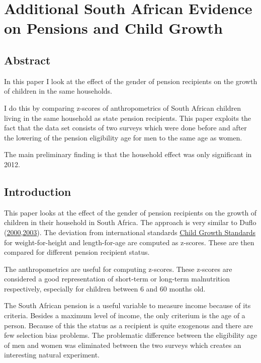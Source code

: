 \documentclass[draft.tex]{subfiles}
\begin{document}
\chapter{Additional South African Evidence on Pensions and Child Growth}

\section{Abstract}

In this paper I look at the effect of the gender of pension recipients
on the growth of children in the same households.

I do this by comparing z-scores of anthropometrics of South African
children living in the same household as state pension recipients. This
paper exploits the fact that the data set consists of two surveys which
were done before and after the lowering of the pension eligibility age
for men to the same age as women.

The main preliminary finding is that the household effect was only
significant in 2012.

\section{Introduction}

This paper looks at the effect of the gender of pension recipients on
the growth of children in their household in South Africa. The approach
is very similar to Duflo
(\href{http://www.jstor.org/discover/10.2307/117257}{2000},\href{http://wber.oxfordjournals.org/content/17/1/1}{2003}).
The deviation from international standards
\href{http://www.who.int/childgrowth/en/}{Child Growth Standards} for
weight-for-height and length-for-age are computed as z-scores. These are
then compared for different pension recipient status.

The anthropometrics are useful for computing z-scores. These z-scores
are considered a good representation of short-term or long-term
malnutrition respectively, especially for children between 6 and 60
months old.

The South African pension is a useful variable to measure income because
of its criteria. Besides a maximum level of income, the only criterium
is the age of a person. Because of this the status as a recipient is
quite exogenous and there are few selection bias problems. The
problematic difference between the eligibility age of men and women was
eliminated between the two surveys which creates an interesting natural
experiment.
\end{document}

